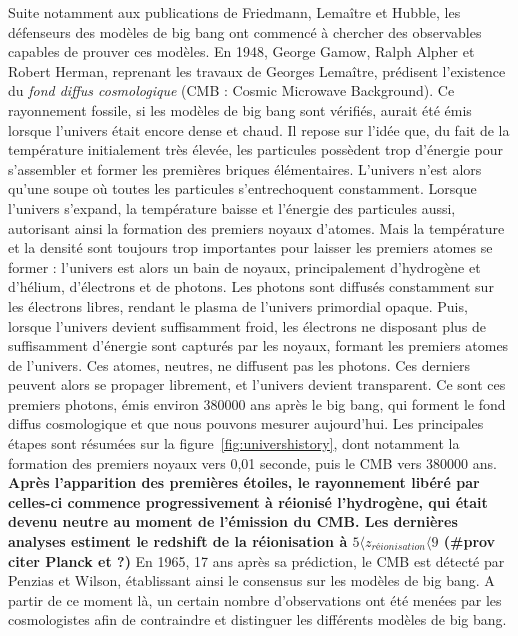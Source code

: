 \documentclass[11pt, twoside, a4paper, openright]{report}
\begin{document}
Suite notamment aux publications de Friedmann, Lemaître et Hubble, les défenseurs des modèles de big bang ont commencé à chercher des observables capables de prouver ces modèles. En 1948, George Gamow, Ralph Alpher et Robert Herman, reprenant les travaux de Georges Lemaître, prédisent l'existence du \emph{fond diffus cosmologique} (CMB : Cosmic Microwave Background). Ce rayonnement fossile, si les modèles de big bang sont vérifiés, aurait été émis lorsque l'univers était encore dense et chaud. Il repose sur l'idée que, du fait de la température initialement très élevée, les particules possèdent trop d'énergie pour s'assembler et former les premières briques élémentaires. L'univers n'est alors qu'une soupe où toutes les particules s'entrechoquent constamment. Lorsque l'univers s'expand, la température baisse et l'énergie des particules aussi, autorisant ainsi la formation des premiers noyaux d'atomes. Mais la température et la densité sont toujours trop importantes pour laisser les premiers atomes se former : l'univers est alors un bain de noyaux, principalement d'hydrogène et d'hélium, d'électrons et de photons. Les photons sont diffusés constamment sur les électrons libres, rendant le plasma de l'univers primordial opaque. Puis, lorsque l'univers devient suffisamment froid, les électrons ne disposant plus de suffisamment d'énergie sont capturés par les noyaux, formant les premiers atomes de l'univers. Ces atomes, neutres, ne diffusent pas les photons. Ces derniers peuvent alors se propager librement, et l'univers devient transparent. Ce sont ces premiers photons, émis environ \num{380000} ans après le big bang, qui forment le fond diffus cosmologique et que nous pouvons mesurer aujourd'hui. Les principales étapes sont résumées sur la figure~\ref{fig:univershistory}, dont notamment la formation des premiers noyaux vers 0,01 seconde, puis le CMB vers \num{380000} ans.
\textbf{Après l'apparition des premières étoiles, le rayonnement libéré par celles-ci commence progressivement à réionisé l'hydrogène, qui était devenu neutre au moment de l'émission du CMB. Les dernières analyses estiment le redshift de la réionisation à $5 \langle z_{réionisation} \langle 9$ (\#prov citer Planck et ?)}
En 1965, 17 ans après sa prédiction, le CMB est détecté par Penzias et Wilson, établissant ainsi le consensus sur les modèles de big bang. A partir de ce moment là, un certain nombre d'observations ont été menées par les cosmologistes afin de contraindre et distinguer les différents modèles de big bang.
\end{document}
